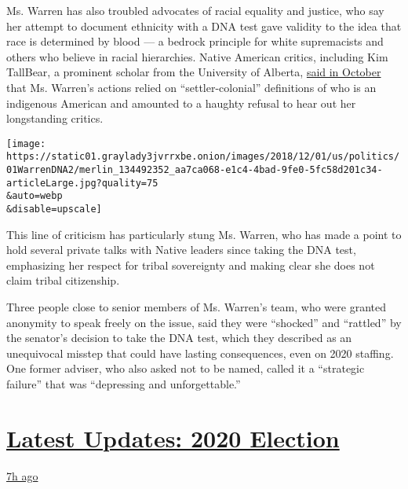 Ms. Warren has also troubled advocates of racial equality and justice,
who say her attempt to document ethnicity with a DNA test gave validity
to the idea that race is determined by blood --- a bedrock principle for
white supremacists and others who believe in racial hierarchies. Native
American critics, including Kim TallBear, a prominent scholar from the
University of Alberta,
\href{https://twitter.com/KimTallBear/status/1051906470923493377}{said
in October} that Ms. Warren's actions relied on ``settler-colonial''
definitions of who is an indigenous American and amounted to a haughty
refusal to hear out her longstanding critics.

\texttt{[image: https://static01.graylady3jvrrxbe.onion/images/2018/12/01/us/politics/01WarrenDNA2/merlin\_134492352\_aa7ca068-e1c4-4bad-9fe0-5fc58d201c34-articleLarge.jpg?quality=75\\\&auto=webp\\\&disable=upscale]}

This line of criticism has particularly stung Ms. Warren, who has made a
point to hold several private talks with Native leaders since taking the
DNA test, emphasizing her respect for tribal sovereignty and making
clear she does not claim tribal citizenship.

Three people close to senior members of Ms. Warren's team, who were
granted anonymity to speak freely on the issue, said they were
``shocked'' and ``rattled'' by the senator's decision to take the DNA
test, which they described as an unequivocal misstep that could have
lasting consequences, even on 2020 staffing. One former adviser, who
also asked not to be named, called it a ``strategic failure'' that was
``depressing and unforgettable.''

\hypertarget{latest-updates-2020-election}{%
\section{\texorpdfstring{\href{https://www.nytimes3xbfgragh.onion/live/2020/08/19/us/dnc-convention-election?action=click\&pgtype=Article\&state=default\&region=MAIN_CONTENT_1\&context=storylines_live_updates}{Latest
Updates: 2020
Election}}{Latest Updates: 2020 Election}}\label{latest-updates-2020-election}}

\href{https://www.nytimes3xbfgragh.onion/live/2020/08/19/us/dnc-convention-election?action=click\&pgtype=Article\&state=default\&region=MAIN_CONTENT_1\&context=storylines_live_updates\#night-3-featured-more-policy-a-focus-on-women-and-a-full-throated-rejection-of-trump-by-his-predecessor}{7h
ago}

